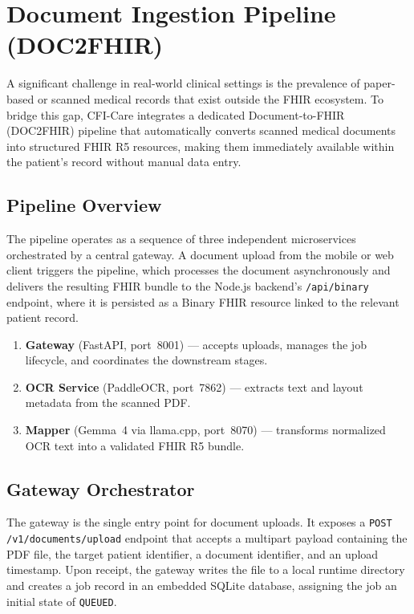 \section{Document Ingestion Pipeline (DOC2FHIR)}\label{sec:doc2fhir}

A significant challenge in real-world clinical settings is the prevalence of
paper-based or scanned medical records that exist outside the FHIR ecosystem.
To bridge this gap, CFI-Care integrates a dedicated Document-to-FHIR
(DOC2FHIR) pipeline that automatically converts scanned medical documents into
structured FHIR R5 resources, making them immediately available within the
patient's record without manual data entry.

\subsection{Pipeline Overview}

The pipeline operates as a sequence of three independent microservices
orchestrated by a central gateway. A document upload from the mobile or web
client triggers the pipeline, which processes the document asynchronously and
delivers the resulting FHIR bundle to the Node.js backend's
\texttt{/api/binary} endpoint, where it is persisted as a Binary FHIR
resource linked to the relevant patient record.

\begin{enumerate}
    \item \textbf{Gateway} (FastAPI, port~8001) --- accepts uploads, manages
          the job lifecycle, and coordinates the downstream stages.
    \item \textbf{OCR Service} (PaddleOCR, port~7862) --- extracts text and
          layout metadata from the scanned PDF\@.
    \item \textbf{Mapper} (Gemma~4 via llama.cpp, port~8070) --- transforms
          normalized OCR text into a validated FHIR R5 bundle.
\end{enumerate}

\subsection{Gateway Orchestrator}

The gateway is the single entry point for document uploads. It exposes a
\texttt{POST /v1/documents/upload} endpoint that accepts a multipart payload
containing the PDF file, the target patient identifier, a document
identifier, and an upload timestamp. Upon receipt, the gateway writes the
file to a local runtime directory and creates a job record in an embedded
SQLite database, assigning the job an initial state of \texttt{QUEUED}.

